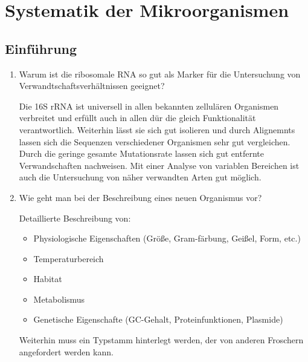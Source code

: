 
\section{Systematik der Mikroorganismen}
\subsection{Einführung}
\begin{enumerate}
\item Warum ist die ribosomale RNA so gut als Marker für die Untersuchung von Verwandtschaftsverhältnissen geeignet?
	
	Die 16S rRNA ist universell in allen bekannten zellulären Organismen verbreitet
	und erfüllt auch in allen dür die gleich Funktionalität verantwortlich.
	Weiterhin lässt sie sich gut isolieren
	und durch Alignemnts lassen sich die Sequenzen verschiedener Organismen sehr gut vergleichen.
	Durch die geringe gesamte Mutationsrate lassen sich gut entfernte Verwandschaften nachweisen.
	Mit einer Analyse von variablen Bereichen ist auch die Untersuchung von näher verwandten Arten gut möglich.

\item Wie geht man bei der Beschreibung eines neuen Organismus vor?
	
	Detaillierte Beschreibung von:
	\begin{itemize}
		\item Physiologische Eigenschaften (Größe, Gram-färbung, Geißel, Form, etc.)
		\item Temperaturbereich
		\item Habitat
		\item Metabolismus
		\item Genetische Eigenschafte (GC-Gehalt, Proteinfunktionen, Plasmide)
	\end{itemize}

	Weiterhin muss ein Typstamm hinterlegt werden,
	der von anderen Froschern angefordert werden kann.
		

\end{enumerate}
